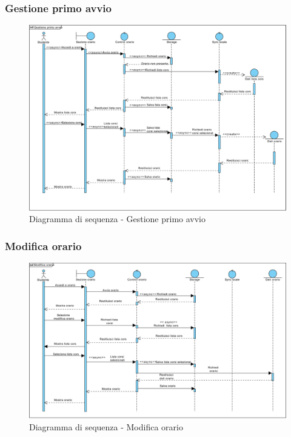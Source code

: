 \subsubsection{Gestione primo avvio} %
\begin{figure}[H]
	\centering
	\includegraphics[width=\textwidth]{imgs/gruppo2/sequence-orario-primo-avvio.pdf}
	\caption{Diagramma di sequenza - Gestione primo avvio}
	\label{fig:sequence-orario-primo-avvio}
\end{figure}

\subsubsection{Modifica orario} %

\begin{figure}[H]
	\centering
	\includegraphics[width=\textwidth]{imgs/gruppo2/sequence-orario-modifica-orario.pdf}
	\caption{Diagramma di sequenza - Modifica orario}
	\label{fig:sequence-orario-modifica-orario}
\end{figure}

